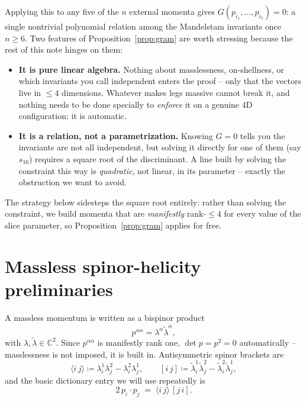 \documentclass[11pt]{article}
\newcommand{\ang}[2]{\langle #1\,#2\rangle}
\newcommand{\sq}[2]{[#1\,#2]}
\newcommand{\lam}{\lambda}
\newcommand{\lt}{\tilde\lambda}
\newcommand{\eqdef}{\coloneqq}
\theoremstyle{definition}
\begin{document}
Applying this to any five of the $n$ external momenta gives $G(p_{i_1},\dots,p_{i_5})=0$: a
single nontrivial polynomial relation among the Mandelstam invariants once $n\ge 6$. Two
features of Proposition~\ref{prop:gram} are worth stressing because the rest of this note hinges
on them:
\begin{itemize}
\item \textbf{It is pure linear algebra.} Nothing about masslessness, on-shellness, or which
  invariants you call independent enters the proof -- only that the vectors live in $\le 4$
  dimensions. Whatever makes legs massive cannot break it, and nothing needs to be done
  specially to \emph{enforce} it on a genuine 4D configuration: it is automatic.
\item \textbf{It is a relation, not a parametrization.} Knowing $G=0$ tells you the invariants
  are not all independent, but solving it directly for one of them (say $s_{16}$) requires a
  square root of the discriminant. A line built by solving the constraint this way is
  \emph{quadratic}, not linear, in its parameter -- exactly the obstruction we want to avoid.
\end{itemize}

The strategy below sidesteps the square root entirely: rather than solving the constraint, we
build momenta that are \emph{manifestly} rank-$\le\!4$ for every value of the slice parameter, so
Proposition~\ref{prop:gram} applies for free.

\section{Massless spinor-helicity preliminaries}

A massless momentum is written as a bispinor product
\begin{equation}
p^{\alpha\dot\alpha} = \lam^\alpha \lt^{\dot\alpha},
\end{equation}
with $\lam,\lt \in \mathbb{C}^2$. Since $p^{\alpha\dot\alpha}$ is manifestly rank one,
$\det p = p^2 = 0$ automatically -- masslessness is not imposed, it is built in. Antisymmetric
spinor brackets are
\begin{equation}
\ang{i}{j} \eqdef \lam_i^1\lam_j^2 - \lam_i^2\lam_j^1, \qquad
\sq{i}{j} \eqdef \lt_i^1\lt_j^2 - \lt_i^2\lt_j^1 ,
\end{equation}
and the basic dictionary entry we will use repeatedly is
\begin{equation}
2\, p_i\!\cdot\! p_j \;=\; \ang{i}{j}\,\sq{j}{i}. \label{eq:2pdotp}
\end{equation}
\end{document}

